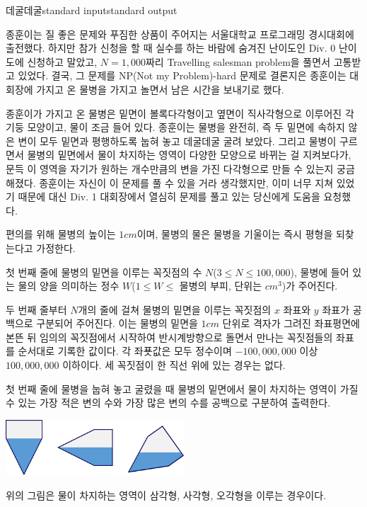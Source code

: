 \begin{problem}{데굴데굴}{standard input}{standard output}

종훈이는 질 좋은 문제와 푸짐한 상품이 주어지는 서울대학교 프로그래밍 경시대회에 출전했다. 하지만 참가 신청을 할 때 실수를 하는 바람에 숨겨진 난이도인 Div. 0 난이도에 신청하고 말았고, $N = 1,000$짜리 Travelling salesman problem을 풀면서 고통받고 있었다. 결국, 그 문제를 NP(Not my Problem)-hard 문제로 결론지은 종훈이는 대회장에 가지고 온 물병을 가지고 놀면서 남은 시간을 보내기로 했다.

종훈이가 가지고 온 물병은 밑면이 볼록다각형이고 옆면이 직사각형으로 이루어진 각기둥 모양이고, 물이 조금 들어 있다. 종훈이는 물병을 완전히, 즉 두 밑면에 속하지 않은 변이 모두 밑면과 평행하도록 눕혀 놓고 데굴데굴 굴려 보았다. 그리고 물병이 구르면서 물병의 밑면에서 물이 차지하는 영역이 다양한 모양으로 바뀌는 걸 지켜보다가, 문득 이 영역을 자기가 원하는 개수만큼의 변을 가진 다각형으로 만들 수 있는지 궁금해졌다. 종훈이는 자신이 이 문제를 풀 수 있을 거라 생각했지만, 이미 너무 지쳐 있었기 때문에 대신 Div. 1 대회장에서 열심히 문제를 풀고 있는 당신에게 도움을 요청했다.

편의를 위해 물병의 높이는 $1cm$이며, 물병의 물은 물병을 기울이는 즉시 평형을 되찾는다고 가정한다.

\InputFile
첫 번째 줄에 물병의 밑면을 이루는 꼭짓점의 수 $N$($3 \le N \le 100,000$), 물병에 들어 있는 물의 양을 의미하는 정수 $W$($1 \le W \le$ 물병의 부피, 단위는 $cm^{3}$)가 주어진다.

두 번째 줄부터 $N$개의 줄에 걸쳐 물병의 밑면을 이루는 꼭짓점의 $x$ 좌표와 $y$ 좌표가 공백으로 구분되어 주어진다. 이는 물병의 밑면을 $1cm$ 단위로 격자가 그려진 좌표평면에 본뜬 뒤 임의의 꼭짓점에서 시작하여 반시계방향으로 돌면서 만나는 꼭짓점들의 좌표를 순서대로 기록한 값이다. 각 좌푯값은 모두 정수이며 $-100,000,000$ 이상 $100,000,000$ 이하이다. 세 꼭짓점이 한 직선 위에 있는 경우는 없다.

\OutputFile
첫 번째 줄에 물병을 눕혀 놓고 굴렸을 때 물병의 밑면에서 물이 차지하는 영역이 가질 수 있는 가장 적은 변의 수와 가장 많은 변의 수를 공백으로 구분하여 출력한다.

\Example

\begin{example}
%
\end{example}

\Notes
\begin{center}
  \includegraphics[width=0.5\textwidth]{roll.png}
\end{center}

위의 그림은 물이 차지하는 영역이 삼각형, 사각형, 오각형을 이루는 경우이다.

\end{problem}
